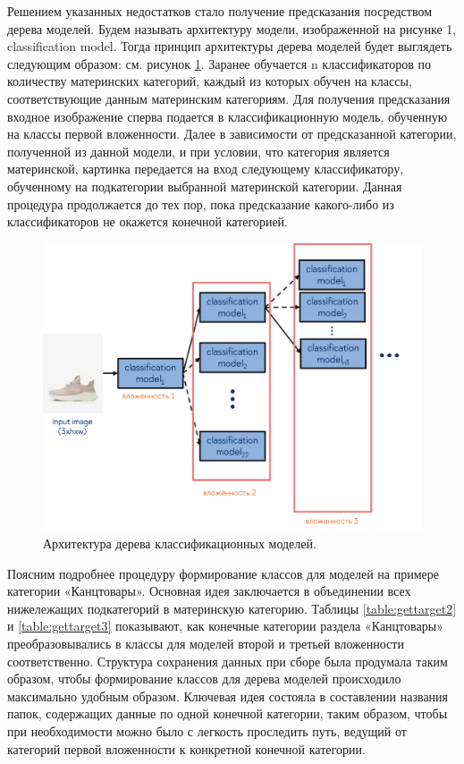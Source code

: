 \documentclass[a4paper,12pt]{extarticle}
\begin{document}
Решением указанных недостатков стало получение предсказания посредством дерева моделей. Будем называть архитектуру модели, изображенной на рисунке 1, classification model. Тогда принцип архитектуры дерева моделей будет выглядеть следующим образом: см. рисунок \ref{fig:classification_treemodel}. Заранее обучается n классификаторов по количеству материнских категорий, каждый из которых обучен на классы, соответствующие данным материнским категориям. Для получения предсказания входное изображение сперва подается в классификационную модель, обученную на классы первой вложенности. Далее в зависимости от предсказанной категории, полученной из данной модели, и при условии, что категория является материнской, картинка передается на вход следующему классификатору, обученному на подкатегории выбранной материнской категории. Данная процедура продолжается до тех пор, пока предсказание какого-либо из классификаторов не окажется конечной категорией.

\begin{figure}[ht]
	\centering
	\includegraphics[scale=0.7]{classification/classification_treemodel.png}
	\caption{Архитектура дерева классификационных моделей.}
	\label{fig:classification_treemodel}
\end{figure}

Поясним подробнее процедуру формирование классов для моделей на примере категории «Канцтовары». Основная идея заключается в объединении всех нижележащих подкатегорий в материнскую категорию. Таблицы \ref{table:gettarget2} и \ref{table:gettarget3} показывают, как конечные категории раздела «Канцтовары» преобразовывались в классы для моделей второй и третьей вложенности соответственно. Структура сохранения данных при сборе была продумала таким образом, чтобы формирование классов для дерева моделей происходило максимально удобным образом. Ключевая идея состояла в составлении названия папок, содержащих данные по одной конечной категории, таким образом, чтобы при необходимости можно было с легкость проследить путь, ведущий от категорий первой вложенности к конкретной конечной категории.
\end{document}
